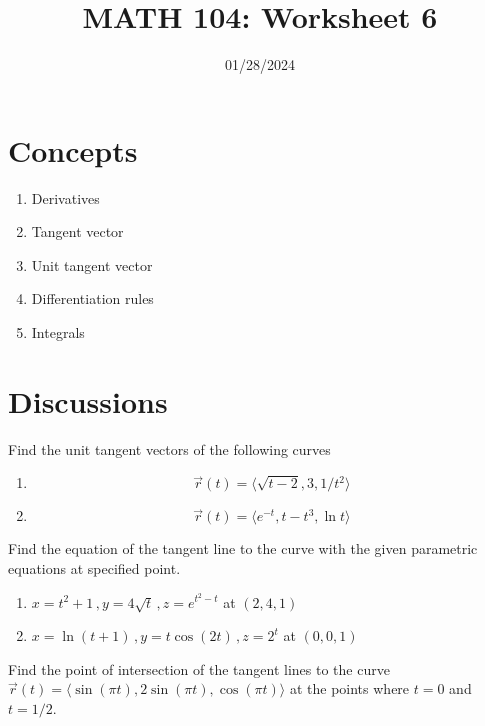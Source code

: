 \documentclass[12pt]{amsart}
\title{ MATH 104: Worksheet 6}
\author{}
\date{01/28/2024}
\begin{document}
\maketitle

\section{Concepts}

\begin{enumerate}
	\item Derivatives
	\item Tangent vector
	\item Unit tangent vector
	\item Differentiation rules
	\item Integrals
\end{enumerate}

\section{Discussions}

\begin{question}
	Find the unit tangent vectors of the following curves
	\begin{enumerate}
		\item $$\vec{r}(t) = \langle \sqrt{t - 2} , 3, 1/t^2 \rangle$$
		      \vspace{7cm}
		\item $$ \vec{r}(t) = \langle e^{-t}, t- t^3, \ln t \rangle$$
		      \vspace{7cm}
	\end{enumerate}
\end{question}

\begin{question}
	Find the equation of the tangent line to the curve with the given parametric equations
	at specified point.
	\begin{enumerate}
		\item $ x = t^2 +1\,, y = 4 \sqrt{t} \,, z = e^{t^2 - t}$  at $(2,4,1)$
		      \vspace{7cm}
		\item $ x = \ln (t +1)\,, y = t\cos(2t) \,, z = 2^t$ at $(0,0,1)$
		      \vspace{7cm}
	\end{enumerate}
\end{question}

\begin{question}
	Find the point of intersection of the tangent lines to the curve
	$\vec{r}(t) = \langle \sin (\pi t), 2 \sin (\pi t), \cos(\pi t) \rangle$
	at the points where $t = 0$ and $t = 1/2$.
\end{question}
\vspace{7cm}
\end{document}
